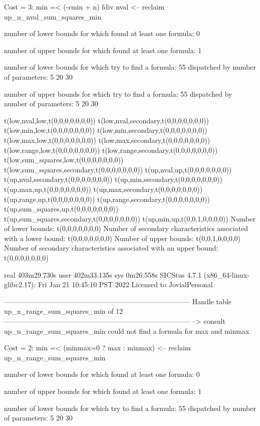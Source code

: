 Cost =  3:  min =< (-rmin + n) fdiv nval %
<-- reclaim up_n_nval_sum_squares_min

number of lower bounds for which found at least one formula: 0

number of upper bounds for which found at least one formula: 1

number of lower bounds for which try to find a formula: 55
dispatched by number of parameters: 5  20  30

number of upper bounds for which try to find a formula: 55
dispatched by number of parameters: 5  20  30

t(low,nval,low,t(0,0,0,0,0,0,0))
t(low,nval,secondary,t(0,0,0,0,0,0,0))
t(low,min,low,t(0,0,0,0,0,0,0))
t(low,min,secondary,t(0,0,0,0,0,0,0))
t(low,max,low,t(0,0,0,0,0,0,0))
t(low,max,secondary,t(0,0,0,0,0,0,0))
t(low,range,low,t(0,0,0,0,0,0,0))
t(low,range,secondary,t(0,0,0,0,0,0,0))
t(low,sum_squares,low,t(0,0,0,0,0,0,0))
t(low,sum_squares,secondary,t(0,0,0,0,0,0,0))
t(up,nval,up,t(0,0,0,0,0,0,0))
t(up,nval,secondary,t(0,0,0,0,0,0,0))
t(up,min,secondary,t(0,0,0,0,0,0,0))
t(up,max,up,t(0,0,0,0,0,0,0))
t(up,max,secondary,t(0,0,0,0,0,0,0))
t(up,range,up,t(0,0,0,0,0,0,0))
t(up,range,secondary,t(0,0,0,0,0,0,0))
t(up,sum_squares,up,t(0,0,0,0,0,0,0))
t(up,sum_squares,secondary,t(0,0,0,0,0,0,0))
t(up,min,up,t(0,0,1,0,0,0,0))
Number of lower bounds:                                             t(0,0,0,0,0,0,0)
Number of secondary characteristics associated with a lower bound:  t(0,0,0,0,0,0,0)
Number of upper bounds:                                             t(0,0,1,0,0,0,0)
Number of secondary characteristics associated with an upper bound: t(0,0,0,0,0,0,0)

real	403m29.730s
user	402m33.135s
sys	0m26.558s
SICStus 4.7.1 (x86_64-linux-glibc2.17): Fri Jan 21 10:45:10 PST 2022
Licensed to JovialPersonal


--------------------------------------------------------------------------------
Handle table up_n_range_sum_squares_min of 12
--------------------------------------------------------------------------------
--> consult up_n_range_sum_squares_min
could not find a formula for max and minmax

Cost =  2:  min =< (minmax=0 ? max : minmax)
<-- reclaim up_n_range_sum_squares_min

number of lower bounds for which found at least one formula: 0

number of upper bounds for which found at least one formula: 1

number of lower bounds for which try to find a formula: 55
dispatched by number of parameters: 5  20  30

